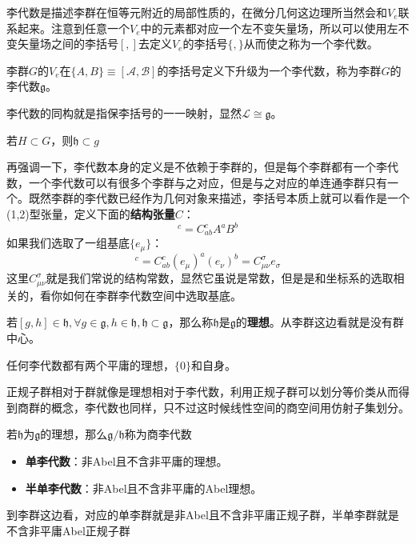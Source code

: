李代数是描述李群在恒等元附近的局部性质的，在微分几何这边理所当然会和$V_e$联系起来。注意到任意一个$V_e$中的元素都对应一个左不变矢量场，所以可以使用左不变矢量场之间的李括号$[,]$去定义$V_e$的李括号$\{,\}$从而使之称为一个李代数。
\begin{definition}[李群的李代数]
	李群$G$的$V_e$在$\{A,B\}\equiv[\mathscr{A},\mathscr{B}]$的李括号定义下升级为一个李代数，称为李群$G$的李代数$\mathfrak{g}$。
\end{definition}
李代数的同构就是指保李括号的一一映射，显然$\mathscr{L}\cong\mathfrak{g}$。
\begin{theorem}
	若$H\subset G$，则$\mathfrak{h}\subset{g}$
\end{theorem}
再强调一下，李代数本身的定义是不依赖于李群的，但是每个李群都有一个李代数，一个李代数可以有很多个李群与之对应，但是与之对应的单连通李群只有一个。既然李群的李代数已经作为几何对象来描述，李括号本质上就可以看作是一个(1,2)型张量，定义下面的\textbf{结构张量}$C$：
\begin{equation}
	[A,B]^c=C^c_{ab}A^a B^b
\end{equation}
如果我们选取了一组基底$\{e_\mu\}$：
\begin{equation}
	[e_\mu,e_\nu]^c=C^c_{ab}(e_\mu)^a(e_\nu)^b=C^{\sigma}_{\mu\nu}e_\sigma
\end{equation}
这里$C^{\sigma}_{\mu\nu}$就是我们常说的结构常数，显然它虽说是常数，但是是和坐标系的选取相关的，看你如何在李群李代数空间中选取基底。
\begin{definition}
	若$[g,h]\in\mathfrak{h},\forall g\in \mathfrak{g},h\in \mathfrak{h},\mathfrak{h}\subset{\mathfrak{g}}$，那么称$\mathfrak{h}$是$\mathfrak{g}$的\textbf{理想}。从李群这边看就是没有群中心。
\end{definition}
\begin{example}
	任何李代数都有两个平庸的理想，$\{0\}$和自身。
\end{example}
正规子群相对于群就像是理想相对于李代数，利用正规子群可以划分等价类从而得到商群的概念，李代数也同样，只不过这时候线性空间的商空间用仿射子集划分。

\begin{definition}
	若$\mathfrak{h}$为$\mathfrak{g}$的理想，那么$\mathfrak{g}/\mathfrak{h}$称为商李代数
\end{definition}
\begin{theorem}
	\begin{itemize}
		\item \textbf{单李代数}：非Abel且不含非平庸的理想。
		\item \textbf{半单李代数}：非Abel且不含非平庸的Abel理想。
	\end{itemize}
	到李群这边看，对应的单李群就是非Abel且不含非平庸正规子群，半单李群就是不含非平庸Abel正规子群
\end{theorem}

